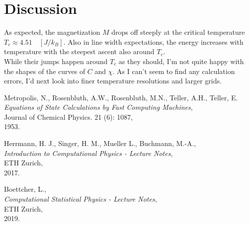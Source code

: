 \documentclass[11pt,a4paper]{article}
\begin{document}
\section{Discussion}
As expected, the magnetization $M$ drops off steeply at the critical temperature $T_c \approx 4.51 \quad [J/k_B]$.
Also in line width expectations, the energy increases with temperature with the steepest ascent also around $T_c$.\\
While their jumps happen around $T_c$ as they should, I'm not quite happy with the shapes of the curves of $C$ and $\chi$.
As I can't seem to find any calculation errors, I'd next look into finer temperature resolutions and larger grids.


\pagebreak
\begin{thebibliography}{99}


Metropolis, N.,
Rosenbluth, A.W.,
Rosenbluth, M.N.,
Teller, A.H.,
Teller, E.\\
\emph{Equations of State Calculations by Fast Computing Machines},\\
Journal of Chemical Physics. 21 (6): 1087,\\
1953.


	Herrmann, H. J.,
	Singer, H. M.,
	Mueller L.,
	Buchmann, M.-A.,\\
	\emph{Introduction to Computational Physics - Lecture Notes},\\
	ETH Zurich,\\
	2017.

	Boettcher, L.,\\
	\emph{Computational Statistical Physics - Lecture Notes},\\
	ETH Zurich,\\
	2019.

\end{thebibliography}
\end{document}
